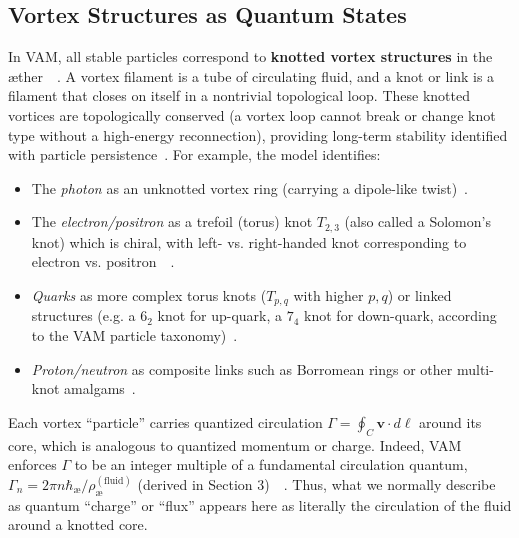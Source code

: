 \documentclass[preprint]{revtex4-2}
\begin{document}
    \subsection{Vortex Structures as Quantum States}
    In VAM, all stable particles correspond to \textbf{knotted vortex structures} in the æther~\cite{reference_22}~\cite{reference_23}. A vortex filament is a tube of circulating fluid, and a knot or link is a filament that closes on itself in a nontrivial topological loop. These knotted vortices are topologically conserved (a vortex loop cannot break or change knot type without a high-energy reconnection), providing long-term stability identified with particle persistence~\cite{reference_24}. For example, the model identifies:
    \begin{itemize}
        \item The \emph{photon} as an unknotted vortex ring (carrying a dipole-like twist)~\cite{reference_25}.
        \item The \emph{electron/positron} as a trefoil (torus) knot $T_{2,3}$ (also called a Solomon’s knot) which is chiral, with left- vs. right-handed knot corresponding to electron vs. positron~\cite{reference_26}~\cite{reference_27}.
        \item \emph{Quarks} as more complex torus knots ($T_{p,q}$ with higher $p,q$) or linked structures (e.g. a $6_2$ knot for up-quark, a $7_4$ knot for down-quark, according to the VAM particle taxonomy)~\cite{reference_28}.
        \item \emph{Proton/neutron} as composite links such as Borromean rings or other multi-knot amalgams~\cite{reference_29}.
    \end{itemize}
    Each vortex “particle” carries quantized circulation $\Gamma = \oint_C \mathbf{v}\cdot d\boldsymbol{\ell}$ around its core, which is analogous to quantized momentum or charge. Indeed, VAM enforces $\Gamma$ to be an integer multiple of a fundamental circulation quantum, $\Gamma_n = 2\pi n \hbar_{\text{\ae}}/\rho_{\text{\ae}}^{(\text{fluid})}$ (derived in Section 3)~\cite{reference_30}~\cite{reference_31}. Thus, what we normally describe as quantum “charge” or “flux” appears here as literally the circulation of the fluid around a knotted core.
\end{document}
